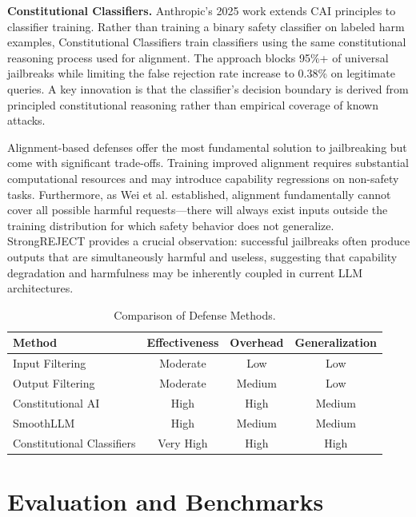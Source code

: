 \documentclass[conference]{IEEEtran}
\begin{document}
\textbf{Constitutional Classifiers.} Anthropic's 2025 work \cite{anthropic2025constitutional_classifiers} extends CAI principles to classifier training. Rather than training a binary safety classifier on labeled harm examples, Constitutional Classifiers train classifiers using the same constitutional reasoning process used for alignment. The approach blocks 95\%+ of universal jailbreaks while limiting the false rejection rate increase to 0.38\% on legitimate queries. A key innovation is that the classifier's decision boundary is derived from principled constitutional reasoning rather than empirical coverage of known attacks.

Alignment-based defenses offer the most fundamental solution to jailbreaking but come with significant trade-offs. Training improved alignment requires substantial computational resources and may introduce capability regressions on non-safety tasks. Furthermore, as Wei et al. \cite{wei2023jailbroken} established, alignment fundamentally cannot cover all possible harmful requests---there will always exist inputs outside the training distribution for which safety behavior does not generalize. StrongREJECT \cite{souly2024strongreject} provides a crucial observation: successful jailbreaks often produce outputs that are simultaneously harmful and useless, suggesting that capability degradation and harmfulness may be inherently coupled in current LLM architectures.

\begin{table}[h]
\centering
\caption{Comparison of Defense Methods.}
\label{tab:defense-comparison}
\begin{tabular}{@{}p{2.8cm}ccc@{}}
\toprule
Method & Effectiveness & Overhead & Generalization \\ \midrule
Input Filtering & Moderate & Low & Low \\
Output Filtering & Moderate & Medium & Low \\
Constitutional AI & High & High & Medium \\
SmoothLLM & High & Medium & Medium \\
Constitutional Classifiers & Very High & High & High \\ \bottomrule
\end{tabular}
\end{table}


\section{Evaluation and Benchmarks}
\end{document}
